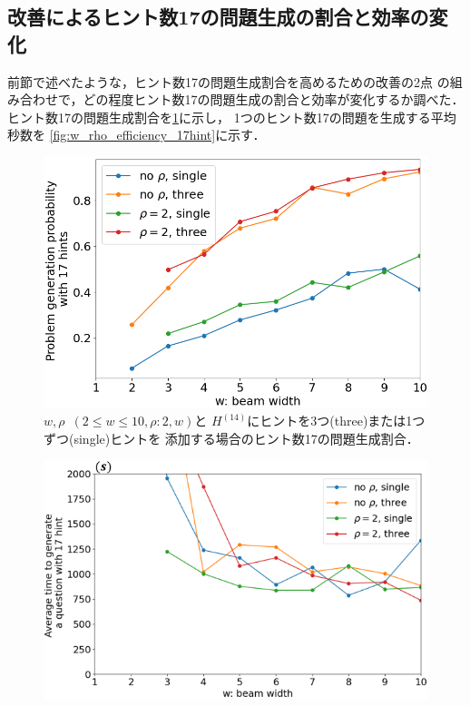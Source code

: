 \documentclass[a4paper, 9pt]{jarticle}
\begin{document}
\begin{論文概要}
\section{改善によるヒント数17の問題生成の割合と効率の変化}
前節で述べたような，ヒント数17の問題生成割合を高めるための改善の2点
の組み合わせで，どの程度ヒント数17の問題生成の割合と効率が変化するか調べた．
ヒント数17の問題生成割合を\figurename{\ref{fig:w_rho_prob_17hint}}に示し，
1つのヒント数17の問題を生成する平均秒数を
\figurename{\ref{fig:w_rho_efficiency_17hint}}に示す．
\begin{figure}[bt]
  \vspace{-3mm}
  \centering
  \includegraphics[keepaspectratio, scale=0.3]{w_rho_prob_17hint.png}
  \caption{$w,\rho$~$(2 \leq w \leq 10,\rho:2,w)$と
  $H^{(14)}$にヒントを3つ(three)または1つずつ(single)ヒントを
  添加する場合のヒント数17の問題生成割合．} 
  \label{fig:w_rho_prob_17hint}
\end{figure}
\begin{figure}[bt]
  \vspace{-2mm}
  \centering
  \includegraphics[keepaspectratio, scale=0.4]{w_rho_efficiency_17hint.png}

\end{figure}
\end{論文概要}
\end{document}
